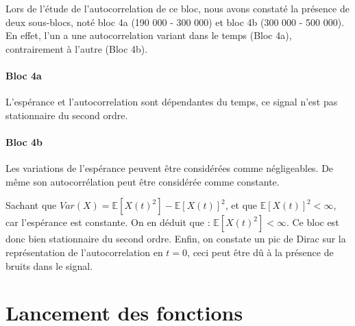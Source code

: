 \documentclass[french, a4paper, 12pt, openany]{book}
\begin{document}
	Lors de l'étude de l'autocorrelation de ce bloc, nous avons constaté la présence de deux sous-blocs, noté bloc 4a (190 000 - 300 000) et bloc 4b (300 000 - 500 000). En effet, l'un a une autocorrelation variant dans le temps (Bloc 4a), contrairement à l'autre (Bloc 4b).

	\subsubsection{Bloc 4a}
	L'espérance et l'autocorrelation sont dépendantes du temps, ce signal n'est pas stationnaire du second ordre.

	\subsubsection{Bloc 4b}
	Les variations de l'espérance peuvent être considérées comme négligeables. De même son autocorrélation peut être considérée comme constante.
	
Sachant que \begin{math}Var(X) = \mathbb{E}[X(t)^2] - \mathbb{E}[X(t)]^2\end{math}, et que \begin{math}\mathbb{E}[X(t)]^2<\infty\end{math}, car l'espérance est constante. On en déduit que : \begin{math}\mathbb{E}[X(t)^2]<\infty\end{math}. Ce bloc est donc bien stationnaire du second ordre.
Enfin, on constate un pic de Dirac sur la représentation de l'autocorrelation en \(t = 0\), ceci peut être dû à la présence de bruits dans le signal.

\chapter{Lancement des fonctions}
\end{document}
